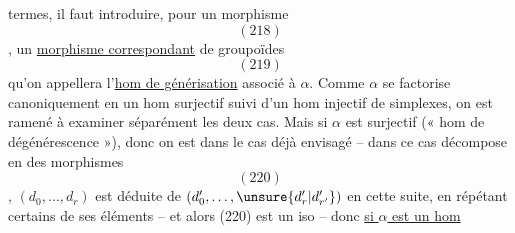 termes, il faut introduire, 
pour un morphisme
\[
(218)
\]
,
un \uline{morphisme correspondant} de groupoïdes
\[
(219)
\]
qu'on appellera l'\uline{hom de générisation}
associé à $\alpha$.
Comme $\alpha$ se factorise
canoniquement en un hom surjectif
suivi d'un hom injectif de simplexes,
on est ramené à examiner séparément
les deux cas. Mais si $\alpha$ est surjectif
(« hom de dégénérescence »), 
donc on est dans le cas déjà envisagé --
 dans ce cas
décompose en des morphismes
\[
(220)
\]
,
$(d_0,\ldots,d_r)$ est déduite de $(d'_0,\ldots,\unsure{d'_r|d'_{r'}})$
en  cette suite, en répétant certains
de ses éléments -- et  alors (220) est
un iso -- donc \uline{si $\alpha$ est un hom}

